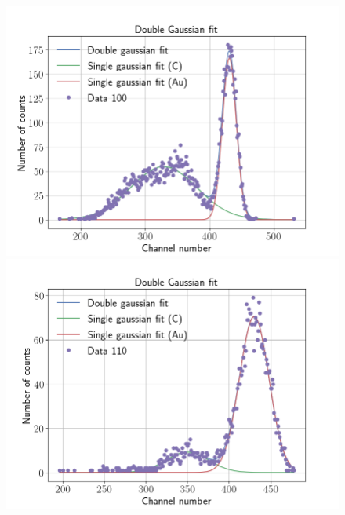 \begin{figure}
\includegraphics[width=0.99\columnwidth]{Data_100}
\includegraphics[width=0.99\columnwidth]{Data_110}
\label{fig_angular_dependency}
\end{figure}

